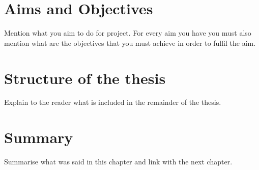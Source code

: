 \section{Aims and Objectives}
Mention what you aim to do for project. For every aim you have you must also mention what are the objectives that you must achieve in order to fulfil the aim.

\section{Structure of the thesis}
Explain to the reader what is included in the remainder of the thesis.

\section{Summary}
Summarise what was said in this chapter and link with the next chapter.

